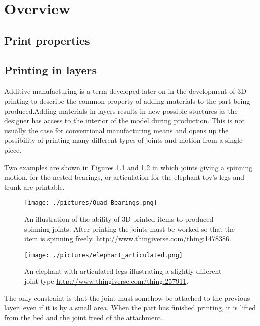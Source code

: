 

\chapter{Overview}




\section{Print properties}

\section{Printing in layers}

Additive manufacturing is a term developed later on in the development of 3D printing to describe the common property of adding materials to the part being produced.Adding materials in layers results in new possible stuctures as the designer has access to the interior of the model during production. This is not usually the case for conventional manufacturing means and opens up the possibility of printing many different types of joints and motion from a single piece. 

Two examples are shown in Figures \ref{fig:quad_bearings} and \ref{fig:articulated_elephant} in which joints giving a spinning motion, for the nested bearings, or articulation for the elephant toy's legs and trunk are printable. 

\begin{figure}[h]
 \centering
 \texttt{[image: ./pictures/Quad-Bearings.png]}
 \caption{An illustration of the ability of 3D printed items to produced spinning joints. After printing the joints must be worked so that the item is spinning freely. \url{http://www.thingiverse.com/thing:1478386}. }
 \label{fig:quad_bearings}
\end{figure}


\begin{figure}[h]
 \centering
 \texttt{[image: ./pictures/elephant\_articulated.png]}
 \caption{An elephant with articulated legs illustrating a slightly different joint type \url{http://www.thingiverse.com/thing:257911}. }
 \label{fig:articulated_elephant}
\end{figure}

The only constraint is that the joint must somehow be attached to the previous layer, even if it is by a small area. When the part has finished printing, it is lifted from the bed and the joint freed of the attachment.


